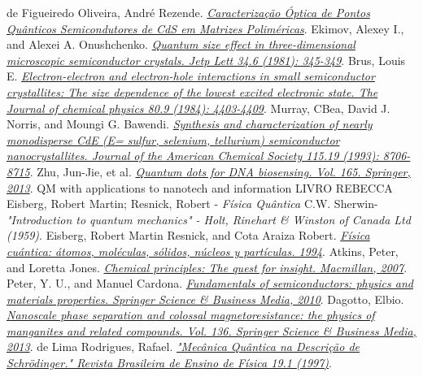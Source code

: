 \documentclass[11pt]{article}
\numberwithin{equation}{section}
\begin{document}
{}
\begin{thebibliography}{99}
 de Figueiredo Oliveira, André Rezende. \href{http://www.infis.ufu.br/sites/infis.ufu.br/files/Anexos/Bookpage/TCC%20F%C3%8DSICA%20DE%20MATERIAIS%202009_2%20-%20ANDRE%20REZENDE.pdf}
\textit{Caracterização Óptica de Pontos Quânticos Semicondutores de CdS em Matrizes Poliméricas}. 
 Ekimov, Alexey I., and Alexei A. Onushchenko. \href{https://www.researchgate.net/profile/Alexey_Onushchehko/publication/234289541_Quantum_Size_Effect_in_Three-Dimensional_Microscopic_Semiconductor_Crystals/links/0c9605305fa93c4e3d000000.pdf}\textit{Quantum size effect in three-dimensional microscopic semiconductor crystals. Jetp Lett 34.6 (1981): 345-349}.
 Brus, Louis E. \href{http://aip.scitation.org/doi/10.1063/1.447218}\textit{Electron-electron and electron-hole interactions in small semiconductor crystallites: The size dependence of the lowest excited electronic state. The Journal of chemical physics 80.9 (1984): 4403-4409}.
 Murray, CBea, David J. Norris, and Moungi G. Bawendi. \href{http://pubs.acs.org/doi/abs/10.1021/ja00072a025?journalCode=jacsat}\textit{Synthesis and characterization of nearly monodisperse CdE (E= sulfur, selenium, tellurium) semiconductor nanocrystallites. Journal of the American Chemical Society 115.19 (1993): 8706-8715}.
 Zhu, Jun-Jie, et al. \href{https://link.springer.com/book/10.1007/978-3-642-44910-9}\textit{Quantum dots for DNA biosensing. Vol. 165. Springer, 2013}.
 QM with applications to nanotech and information
 LIVRO REBECCA
 Eisberg, Robert Martin; Resnick, Robert - \textit{Física Quântica} %
 C.W. Sherwin- \textit{"Introduction to quantum mechanics" - Holt, Rinehart \& Winston of Canada Ltd (1959)}. %
  Eisberg, Robert Martin Resnick, and Cota Araiza Robert. \href{http://gen.lib.rus.ec/book/index.php?md5=80CCC290E6FFF645ADF0BA24178E4C5D}\textit{Física cuántica: átomos, moléculas, sólidos, núcleos y partículas. 1994}.
  Atkins, Peter, and Loretta Jones. \href{http://gen.lib.rus.ec/book/index.php?md5=6D32E94CECA0A9BD6FFF5F1307078071}\textit{Chemical principles: The quest for insight. Macmillan, 2007}.
  Peter, Y. U., and Manuel Cardona. \href{http://gen.lib.rus.ec/book/index.php?md5=20A8507AB491C812ED2C75D08740987A}\textit{Fundamentals of semiconductors: physics and materials properties. Springer Science \& Business Media, 2010}.
  Dagotto, Elbio. \href{http://gen.lib.rus.ec/book/index.php?md5=3C621FEBFE1EBBF8B376CED188D04A84}\textit{Nanoscale phase separation and colossal magnetoresistance: the physics of manganites and related compounds. Vol. 136. Springer Science \& Business Media, 2013}.
  de Lima Rodrigues, Rafael. \href{http://sbfisica.org.br/rbef/pdf/v19_68.pdf}\textit{"Mecânica Quântica na Descrição de Schrödinger." Revista Brasileira de Ensino de Física 19.1 (1997)}.
 \end{thebibliography}
\end{document}
